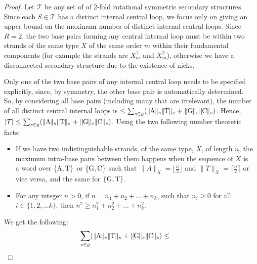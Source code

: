 \begin{proof}
	Let  $\mathcal{T}$ be any set of of $2$-fold rotational symmetric secondary structures.  
	Since each $S \in \mathcal{T}$ has a distinct internal central loop, we  focus only on giving an upper bound on the maximum number of distinct internal central loops. %
	Since $R=2$, the two base pairs forming any  central internal loop must be within two strands of the same type $X$  of the same order $m$ within their fundamental components (for example the strands are $X_m^1$ and $X_m^2$), otherwise we  have a disconnected secondary structure due to the existence of nicks. 
	
	Only one of the two base pairs of any internal central loop needs to be specified explicitly, since, by symmetry, the other base pair is   automatically determined. 
	So, by considering all base pairs (including many that are irrelevant), the number of all distinct central internal loops is  $\leq \sum_{s\in y} (\parallel\! \! \baseA \!\! \parallel_s \parallel\! \! \baseT \!\! \parallel_s+ \parallel\! \! \baseG \!\! \parallel_s\parallel\! \! \baseC \!\! \parallel_s)$. 
	Hence, $ |\mathcal{T}| \leq \sum_{s\in y} (\parallel\! \! \baseA \!\! \parallel_s \parallel\! \! \baseT \!\! \parallel_s+ \parallel\! \! \baseG \!\! \parallel_s\parallel\! \! \baseC \!\! \parallel_s)$.
	Using the two following number theoretic facts:      
	\begin{itemize} \item
		If we have two indistinguishable strands, of the same type, $X$, of length $n$, the maximum intra-base pairs between them happens when the sequence of $X$ is a word over $\{\mathrm{A},\mathrm{T}\}$ or $\{\mathrm{G},\mathrm{C}\}$ such that $\parallel\! \! A \!\! \parallel_X = \lfloor \frac{n}{2}\rfloor$ and $\parallel\! \! T \!\! \parallel_X = \lceil \frac{n}{2}\rceil$ or vice versa, and the same for $\{\mathrm{G},\mathrm{T}\}$.    
	\end{itemize}
	\begin{itemize} \item
		For any integer $n>0$, if $n = n_1 + n_2+ ... + n_k$, such that $n_i\geq 0$ for all $i \in \{1,2, \ldots k\}$, then $n^2 \geq n_1^2 + n_2^2+ ... + n_k^2$.
	\end{itemize}
	We get the following: 
	\begin{align*}
		\sum_{s\in y} (\parallel\! \! \baseA \!\! \parallel_s \parallel\! \! \baseT \!\! \parallel_s+ \parallel\! \! \baseG \!\! \parallel_s\parallel\! \! \baseC \!\! \parallel_s) & \leq  

\end{align*}
\end{proof}
